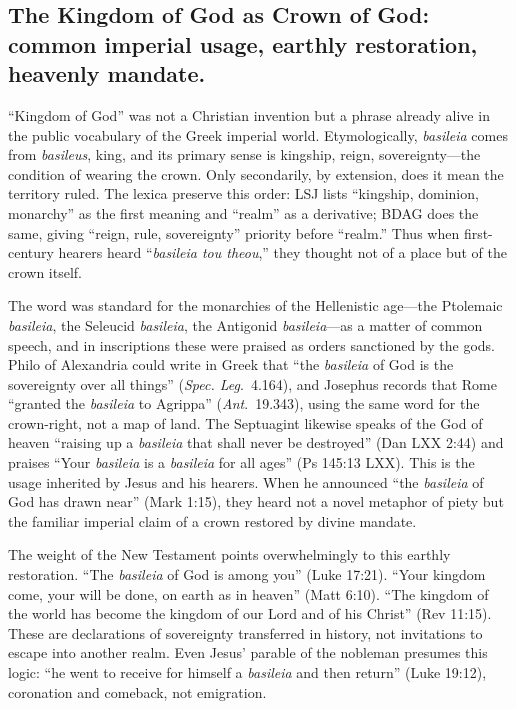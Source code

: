 \subsection{The Kingdom of God as Crown of God: common imperial usage, earthly restoration, heavenly mandate.}\label{subsec:the-kingdom-of-god-as-crown-of-god-common-imperial-usage-earthly-restoration-heavenly-mandate}
“Kingdom of God” was not a Christian invention but a phrase already alive in the public vocabulary of the Greek imperial world.
Etymologically, \emph{basileia} comes from \emph{basileus}, king, and its primary sense is kingship, reign, sovereignty—the condition of wearing the crown.
Only secondarily, by extension, does it mean the territory ruled.
The lexica preserve this order: LSJ lists “kingship, dominion, monarchy” as the first meaning and “realm” as a derivative; BDAG does the same, giving “reign, rule, sovereignty” priority before “realm.”
Thus when first-century hearers heard “\emph{basileia tou theou},” they thought not of a place but of the crown itself.

The word was standard for the monarchies of the Hellenistic age—the Ptolemaic \emph{basileia}, the Seleucid \emph{basileia}, the Antigonid \emph{basileia}—as a matter of common speech, and in inscriptions these were praised as orders sanctioned by the gods.
Philo of Alexandria could write in Greek that “the \emph{basileia} of God is the sovereignty over all things” (\emph{Spec. Leg}.~4.164), and Josephus records that Rome “granted the \emph{basileia} to Agrippa” (\emph{Ant}.~19.343), using the same word for the crown-right, not a map of land.
The Septuagint likewise speaks of the God of heaven “raising up a \emph{basileia} that shall never be destroyed” (Dan LXX 2:44) and praises “Your \emph{basileia} is a \emph{basileia} for all ages” (Ps 145:13 LXX).
This is the usage inherited by Jesus and his hearers.
When he announced “the \emph{basileia} of God has drawn near” (Mark 1:15), they heard not a novel metaphor of piety but the familiar imperial claim of a crown restored by divine mandate.

The weight of the New Testament points overwhelmingly to this earthly restoration.
“The \emph{basileia} of God is among you” (Luke 17:21).
“Your kingdom come, your will be done, on earth as in heaven” (Matt 6:10).
“The kingdom of the world has become the kingdom of our Lord and of his Christ” (Rev 11:15).
These are declarations of sovereignty transferred in history, not invitations to escape into another realm.
Even Jesus’ parable of the nobleman presumes this logic: “he went to receive for himself a \emph{basileia} and then return” (Luke 19:12), coronation and comeback, not emigration.

